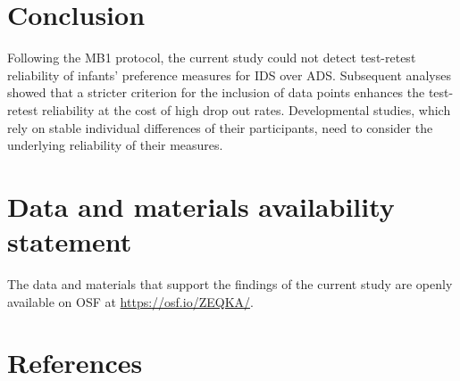 \documentclass[
  english,
  man,floatsintext]{apa6}
\begin{document}
\hypertarget{conclusion}{%
\section{Conclusion}\label{conclusion}}

Following the MB1 protocol, the current study could not detect test-retest reliability of infants' preference measures for IDS over ADS. Subsequent analyses showed that a stricter criterion for the inclusion of data points enhances the test-retest reliability at the cost of high drop out rates. Developmental studies, which rely on stable individual differences of their participants, need to consider the underlying reliability of their measures.

\newpage

\hypertarget{data-and-materials-availability-statement}{%
\section{Data and materials availability statement}\label{data-and-materials-availability-statement}}

The data and materials that support the findings of the current study are openly available on OSF at \url{https://osf.io/ZEQKA/}.

\newpage

\hypertarget{references}{%
\section{References}\label{references}}

\begingroup
\setlength{\parindent}{-0.5in}
\setlength{\leftskip}{0.5in}
\end{document}
